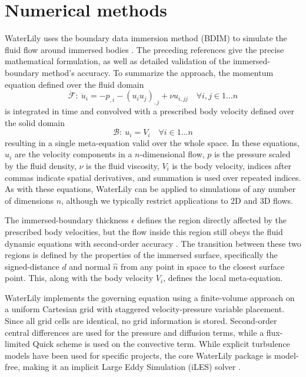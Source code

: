 \documentclass[10pt,a4paper]{article}
\begin{document}
\section{Numerical methods}\label{sec:numerical_methods}
WaterLily uses the boundary data immersion method (BDIM) to simulate the fluid flow around immersed bodies \citep{Weymouth2011,Maertens2014,Lauber2022}. The preceding references give the precise mathematical formulation, as well as detailed validation of the immersed-boundary method's accuracy. To summarize the approach, the momentum equation defined over the fluid domain
\begin{equation}
    \mathcal{\dot F}:\ \dot u_i = -p_{,i} - (u_i u_j)_{,j}+\nu u_{i,jj} \quad \forall i,j \in 1\ldots n
\end{equation}
is integrated in time and convolved with a prescribed body velocity defined over the solid domain
\begin{equation}
    \mathcal{B}:\ u_i = V_i \quad \forall i \in 1\ldots n
\end{equation}
resulting in a single meta-equation valid over the whole space. In these equations, $u_i$ are the velocity components in a $n$-dimensional flow, $p$ is the pressure scaled by the fluid density, $\nu$ is the fluid viscosity, $V_i$ is the body velocity, indices after commas indicate spatial derivatives, and summation is used over repeated indices. As with these equations, WaterLily can be applied to simulations of any number of dimensions $n$, although we typically restrict applications to 2D and 3D flows.

The immersed-boundary thickness $\epsilon$ defines the region directly affected by the prescribed body velocities, but the flow inside this region still obeys the fluid dynamic equations with second-order accuracy \citep{Maertens2014}. The transition between these two regions is defined by the properties of the immersed surface, specifically the signed-distance $d$ and normal $\hat n$ from any point in space to the closest surface point. This, along with the body velocity $V_i$, defines the local meta-equation.

WaterLily implements the governing equation using a finite-volume approach on a uniform Cartesian grid with staggered velocity-pressure variable placement. Since all grid cells are identical, no grid information is stored. Second-order central differences are used for the pressure and diffusion terms, while a flux-limited Quick scheme is used on the convective term. While explicit turbulence models have been used for specific projects, the core WaterLily package is model-free, making it an implicit Large Eddy Simulation (iLES) solver \citep{Margolin2006}.
\end{document}
